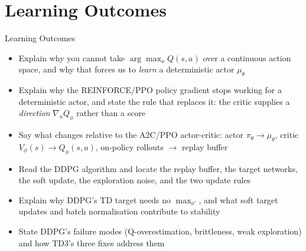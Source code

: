 \section{Learning Outcomes}
\begin{frame}{Learning Outcomes}
    \begin{itemize}
        \setlength{\itemsep}{0.7em}
        \item Explain why you cannot take $\arg\max_a Q(s,a)$ over a continuous action space, and why that forces us to \emph{learn} a deterministic actor $\mu_\theta$
        \item Explain why the REINFORCE/PPO policy gradient stops working for a deterministic actor, and state the rule that replaces it: the critic supplies a \emph{direction} $\nabla_a Q_\phi$ rather than a score
        \item Say what changes relative to the A2C/PPO actor-critic: actor $\pi_\theta \to \mu_\theta$, critic $V_\phi(s) \to Q_\phi(s,a)$, on-policy rollouts $\to$ replay buffer
        \item Read the DDPG algorithm and locate the replay buffer, the target networks, the soft update, the exploration noise, and the two update rules
        \item Explain why DDPG's TD target needs no $\max_{a'}$, and what soft target updates and batch normalisation contribute to stability
        \item State DDPG's failure modes (Q-overestimation, brittleness, weak exploration) and how TD3's three fixes address them
    \end{itemize}
\end{frame}

